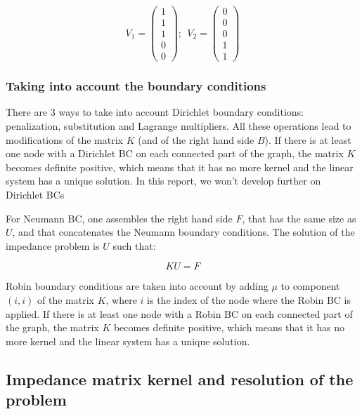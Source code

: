 \documentclass[11pt,a4paper]{article}  %
\begin{document}
\begin{equation}
V_1 = \begin{pmatrix} 1\\1\\1\\0\\0  \end{pmatrix}; \ \ V_2 = \begin{pmatrix} 0\\0\\0\\1\\1  \end{pmatrix}
\end{equation}

\subsubsection{Taking into account the boundary conditions}

There are 3 ways to take into account Dirichlet boundary conditions: penalization, substitution and Lagrange multipliers. All these operations lead to modifications of the matrix $K$ (and of the right hand side $B$). If there is at least one node with a Dirichlet BC on each connected part of the graph, the matrix $K$ becomes definite positive, which means that it has no more kernel and the linear system has a unique solution. In this report, we won't develop further on Dirichlet BCs

For Neumann BC, one assembles the right hand side $F$, that has the same size as $U$, and that concatenates the Neumann boundary conditions. The solution of the impedance problem is $U$ such that:

\begin{equation}
KU = F
\end{equation}

Robin boundary conditions are taken into account by adding $\mu$ to component $(i,i)$ of the matrix $K$, where $i$ is the index of the node where the Robin BC is applied. If there is at least one node with a Robin BC on each connected part of the graph, the matrix $K$ becomes definite positive, which means that it has no more kernel and the linear system has a unique solution.

\subsection{Impedance matrix kernel and resolution of the problem} \label{part:solve}
\end{document}
